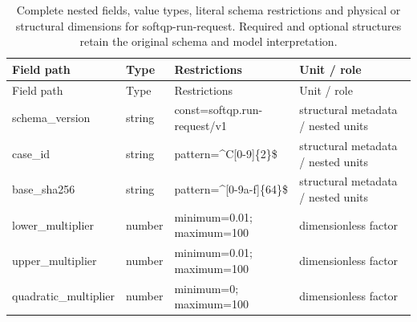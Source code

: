 \begingroup\footnotesize\setlength{\tabcolsep}{3pt}
\begin{longtable}{@{}>{\raggedright\arraybackslash}p{}>{\raggedright\arraybackslash}p{}>{\raggedright\arraybackslash}p{}>{\raggedright\arraybackslash}p{}@{}}
\caption{Complete nested fields, value types, literal schema restrictions and physical or structural dimensions for softqp-run-request. Required and optional structures retain the original schema and model interpretation.}\label{tab:nested-softqp-run-request}\\
\toprule Field path & Type & Restrictions & Unit / role\\\midrule\endfirsthead
\toprule Field path & Type & Restrictions & Unit / role\\\midrule\endhead
\bottomrule\endfoot
schema\_\allowbreak{}version & string & const=\allowbreak{}softqp.\allowbreak{}run-\allowbreak{}request/\allowbreak{}v1 & structural metadata /\allowbreak{} nested units\\
case\_\allowbreak{}id & string & pattern=\allowbreak{}\textasciicircum{}C[0-9]\{2\}\$ & structural metadata /\allowbreak{} nested units\\
base\_\allowbreak{}sha256 & string & pattern=\allowbreak{}\textasciicircum{}[0-9a-\allowbreak{}f]\{64\}\$ & structural metadata /\allowbreak{} nested units\\
lower\_\allowbreak{}multiplier & number & minimum=\allowbreak{}0.\allowbreak{}01; maximum=\allowbreak{}100 & dimensionless factor\\
upper\_\allowbreak{}multiplier & number & minimum=\allowbreak{}0.\allowbreak{}01; maximum=\allowbreak{}100 & dimensionless factor\\
quadratic\_\allowbreak{}multiplier & number & minimum=\allowbreak{}0; maximum=\allowbreak{}100 & dimensionless factor\\
\end{longtable}\endgroup
